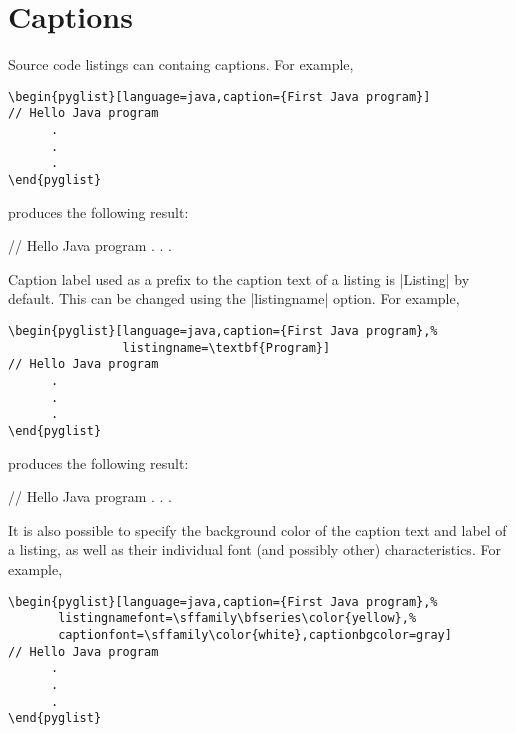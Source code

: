 \documentclass{article}
\begin{document}
\section{Captions}

Source code listings can containg captions. For example, 

\begin{verbatim}
\begin{pyglist}[language=java,caption={First Java program}]
// Hello Java program
      .
      .
      .
\end{pyglist}
\end{verbatim}

produces the following result:

\begin{pyglist}[language=java,caption={First Java program},fontsize=\MacroFont]
// Hello Java program
      .
      .
      .
\end{pyglist}

Caption label used as a prefix to the caption text of a listing is |Listing| by default. This can be changed using the |listingname| option. For example,

\begin{verbatim}
\begin{pyglist}[language=java,caption={First Java program},%
                listingname=\textbf{Program}]
// Hello Java program
      .
      .
      .
\end{pyglist}
\end{verbatim}

produces the following result:

\begin{pyglist}[language=java,caption={First Java program},%
                listingname=\textbf{Program},fontsize=\MacroFont]
// Hello Java program
      .
      .
      .
\end{pyglist}

It is also possible to specify the background color of the caption text and label of a listing, as well as their individual font (and possibly other) characteristics. For example,

\begin{verbatim}
\begin{pyglist}[language=java,caption={First Java program},%
       listingnamefont=\sffamily\bfseries\color{yellow},%
       captionfont=\sffamily\color{white},captionbgcolor=gray]
// Hello Java program
      .
      .
      .
\end{pyglist}
\end{verbatim}
\end{document}
